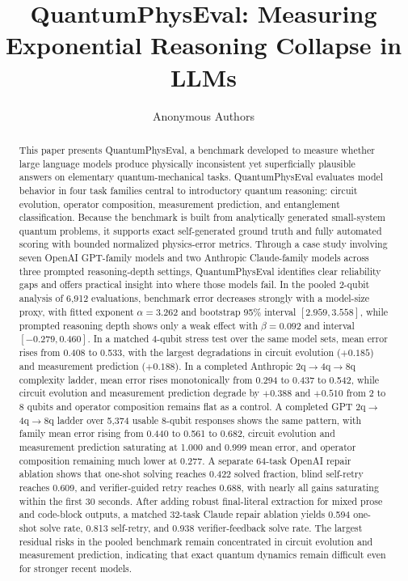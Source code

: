 \documentclass[11pt]{article}
\title{QuantumPhysEval: Measuring Exponential Reasoning Collapse in LLMs}
\author{Anonymous Authors}
\date{}
\begin{document}
\maketitle

\begin{abstract}
This paper presents QuantumPhysEval, a benchmark developed to measure whether large language models produce physically inconsistent yet superficially plausible answers on elementary quantum-mechanical tasks. QuantumPhysEval evaluates model behavior in four task families central to introductory quantum reasoning: circuit evolution, operator composition, measurement prediction, and entanglement classification. Because the benchmark is built from analytically generated small-system quantum problems, it supports exact self-generated ground truth and fully automated scoring with bounded normalized physics-error metrics. Through a case study involving seven OpenAI GPT-family models and two Anthropic Claude-family models across three prompted reasoning-depth settings, QuantumPhysEval identifies clear reliability gaps and offers practical insight into where those models fail. In the pooled 2-qubit analysis of 6{,}912 evaluations, benchmark error decreases strongly with a model-size proxy, with fitted exponent $\alpha=3.262$ and bootstrap 95\% interval $[2.959, 3.558]$, while prompted reasoning depth shows only a weak effect with $\beta=0.092$ and interval $[-0.279, 0.460]$. In a matched 4-qubit stress test over the same model sets, mean error rises from 0.408 to 0.533, with the largest degradations in circuit evolution ($+0.185$) and measurement prediction ($+0.188$). In a completed Anthropic 2q$\rightarrow$4q$\rightarrow$8q complexity ladder, mean error rises monotonically from 0.294 to 0.437 to 0.542, while circuit evolution and measurement prediction degrade by $+0.388$ and $+0.510$ from 2 to 8 qubits and operator composition remains flat as a control. A completed GPT 2q$\rightarrow$4q$\rightarrow$8q ladder over 5{,}374 usable 8-qubit responses shows the same pattern, with family mean error rising from 0.440 to 0.561 to 0.682, circuit evolution and measurement prediction saturating at 1.000 and 0.999 mean error, and operator composition remaining much lower at 0.277. A separate 64-task OpenAI repair ablation shows that one-shot solving reaches 0.422 solved fraction, blind self-retry reaches 0.609, and verifier-guided retry reaches 0.688, with nearly all gains saturating within the first 30 seconds. After adding robust final-literal extraction for mixed prose and code-block outputs, a matched 32-task Claude repair ablation yields 0.594 one-shot solve rate, 0.813 self-retry, and 0.938 verifier-feedback solve rate. The largest residual risks in the pooled benchmark remain concentrated in circuit evolution and measurement prediction, indicating that exact quantum dynamics remain difficult even for stronger recent models.
\end{abstract}
\end{document}
